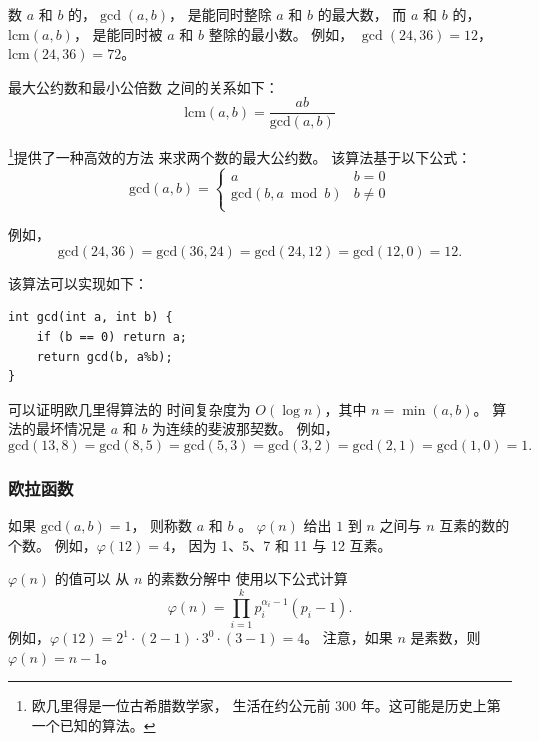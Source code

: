 
数 $a$ 和 $b$ 的，$\gcd(a,b)$，
是能同时整除 $a$ 和 $b$ 的最大数，
而 $a$ 和 $b$ 的，
$\textrm{lcm}(a,b)$，
是能同时被 $a$ 和 $b$ 整除的最小数。
例如，
$\gcd(24,36)=12$，
$\textrm{lcm}(24,36)=72$。

最大公约数和最小公倍数
之间的关系如下：
\[\textrm{lcm}(a,b)=\frac{ab}{\textrm{gcd}(a,b)}\]

\footnote{欧几里得是一位古希腊数学家，
生活在约公元前 300 年。这可能是历史上第一个已知的算法。}提供了一种高效的方法
来求两个数的最大公约数。
该算法基于以下公式：
\begin{equation*}
    \textrm{gcd}(a,b) = \begin{cases}
               a        & b = 0\\
               \textrm{gcd}(b,a \bmod b) & b \neq 0\\
           \end{cases}
\end{equation*}

例如，
\[\textrm{gcd}(24,36) = \textrm{gcd}(36,24)
= \textrm{gcd}(24,12) = \textrm{gcd}(12,0)=12.\]

该算法可以实现如下：
\begin{lstlisting}
int gcd(int a, int b) {
    if (b == 0) return a;
    return gcd(b, a%b);
}
\end{lstlisting}

可以证明欧几里得算法的
时间复杂度为 $O(\log n)$，其中 $n=\min(a,b)$。
算法的最坏情况是
$a$ 和 $b$ 为连续的斐波那契数。
例如，
\[\textrm{gcd}(13,8)=\textrm{gcd}(8,5)
=\textrm{gcd}(5,3)=\textrm{gcd}(3,2)=\textrm{gcd}(2,1)=\textrm{gcd}(1,0)=1.\]

\subsubsection{欧拉函数}


如果 $\textrm{gcd}(a,b)=1$，
则称数 $a$ 和 $b$ 。
 $\varphi(n)$
给出 $1$ 到 $n$ 之间与 $n$ 互素的数的个数。
例如，$\varphi(12)=4$，
因为 1、5、7 和 11
与 12 互素。

$\varphi(n)$ 的值可以
从 $n$ 的素数分解中
使用以下公式计算
\[ \varphi(n) = \prod_{i=1}^k p_i^{\alpha_i-1}(p_i-1). \]
例如，$\varphi(12)=2^1 \cdot (2-1) \cdot 3^0 \cdot (3-1)=4$。
注意，如果 $n$ 是素数，则 $\varphi(n)=n-1$。

